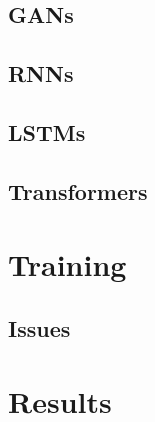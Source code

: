 \subsection{GANs}

\subsection{RNNs}

\subsection{LSTMs}

\subsection{Transformers}

\section{Training}

\subsection{Issues}

\section{Results}